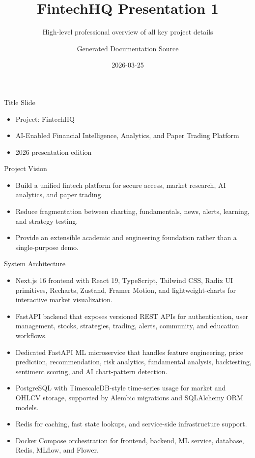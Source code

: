 \documentclass{beamer}
\title{FintechHQ Presentation 1}
\subtitle{High-level professional overview of all key project details}
\author{Generated Documentation Source}
\date{2026-03-25}
\begin{document}
\begin{frame}
\titlepage
\end{frame}
\begin{frame}{Title Slide}
\begin{itemize}
\item Project: FintechHQ
\item AI-Enabled Financial Intelligence, Analytics, and Paper Trading Platform
\item 2026 presentation edition
\end{itemize}
\end{frame}
\begin{frame}{Project Vision}
\begin{itemize}
\item Build a unified fintech platform for secure access, market research, AI analytics, and paper trading.
\item Reduce fragmentation between charting, fundamentals, news, alerts, learning, and strategy testing.
\item Provide an extensible academic and engineering foundation rather than a single-purpose demo.
\end{itemize}
\end{frame}
\begin{frame}{System Architecture}
\begin{itemize}
\item Next.js 16 frontend with React 19, TypeScript, Tailwind CSS, Radix UI primitives, Recharts, Zustand, Framer Motion, and lightweight-charts for interactive market visualization.
\item FastAPI backend that exposes versioned REST APIs for authentication, user management, stocks, strategies, trading, alerts, community, and education workflows.
\item Dedicated FastAPI ML microservice that handles feature engineering, price prediction, recommendation, risk analytics, fundamental analysis, backtesting, sentiment scoring, and AI chart-pattern detection.
\item PostgreSQL with TimescaleDB-style time-series usage for market and OHLCV storage, supported by Alembic migrations and SQLAlchemy ORM models.
\item Redis for caching, fast state lookups, and service-side infrastructure support.
\item Docker Compose orchestration for frontend, backend, ML service, database, Redis, MLflow, and Flower.
\end{itemize}
\end{frame}
\end{document}
